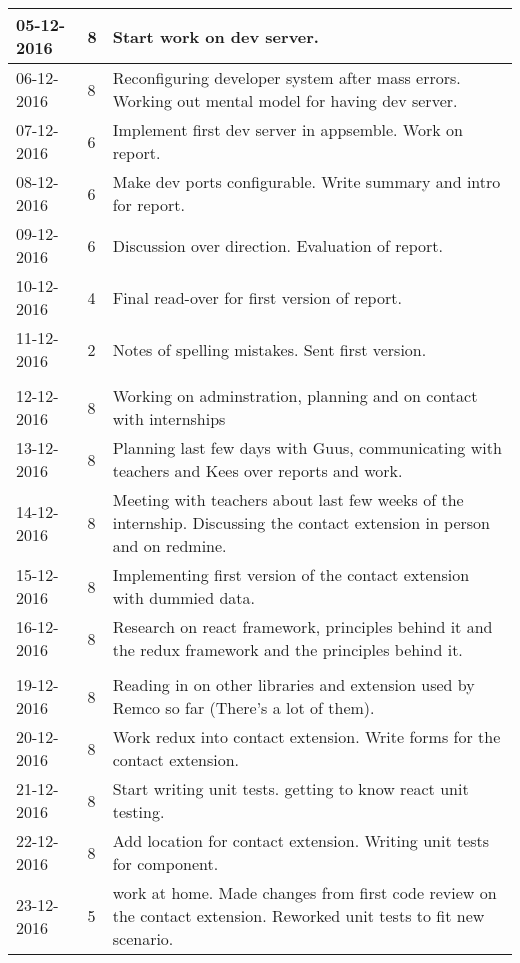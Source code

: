 \begin{tabular}{|p{2cm}|p{1cm}|p{10cm}|}
	05-12-2016 & 8 & Start work on dev server. \\ \hline
	06-12-2016 & 8 & Reconfiguring developer system after mass errors. Working out mental model for having dev server. \\ \hline
	07-12-2016 & 6 & Implement first dev server in appsemble. Work on report. \\ \hline
	08-12-2016 & 6 & Make dev ports configurable. Write summary and intro for report. \\ \hline
	09-12-2016 & 6 & Discussion over direction. Evaluation of report. \\ \hline
	10-12-2016 & 4 & Final read-over for first version of report. \\ \hline
	11-12-2016 & 2 & Notes of spelling mistakes. Sent first version. \\ \hline
	\\ \hline
	
	12-12-2016 & 8 & Working on adminstration, planning and on contact with internships \\ \hline
	13-12-2016 & 8 & Planning last few days with Guus, communicating with teachers and Kees over reports and work. \\ \hline
	14-12-2016 & 8 & Meeting with teachers about last few weeks of the internship. Discussing the contact extension in person and on redmine. \\ \hline
	15-12-2016 & 8 & Implementing first version of the contact extension with dummied data. \\ \hline
	16-12-2016 & 8 & Research on react framework, principles behind it and the redux framework and the principles behind it. \\ \hline
	
	\\ \hline
	
	19-12-2016 & 8 & Reading in on other libraries and extension used by Remco so far (There's a lot of them). \\ \hline
	20-12-2016 & 8 & Work redux into contact extension. Write forms for the contact extension. \\ \hline
	21-12-2016 & 8 & Start writing unit tests. getting to know react unit testing. \\ \hline
	22-12-2016 & 8 & Add location for contact extension. Writing unit tests for component. \\ \hline
	23-12-2016 & 5 & work at home. Made changes from first code review on the contact extension. Reworked unit tests to fit new scenario. \\ \hline
	
\end{tabular}

